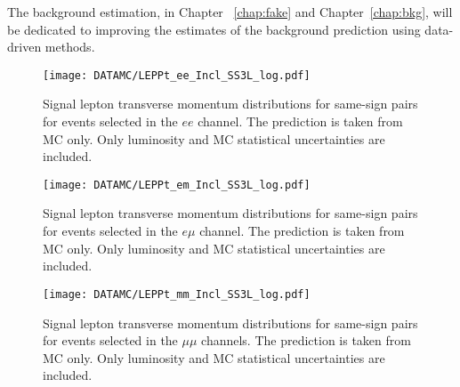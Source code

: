 The background estimation, in Chapter ~\ref{chap:fake} and Chapter~\ref{chap:bkg}, will be dedicated to improving the estimates of 
the background prediction using data-driven methods.



 \begin{figure}[htb!]
 \centering
 {\texttt{[image: DATAMC/LEPPt\_ee\_Incl\_SS3L\_log.pdf]}}
\caption{Signal lepton transverse momentum distributions for same-sign pairs for events selected in the $ee$ channel.  
The prediction is taken from MC only.
Only luminosity and MC statistical uncertainties are included.
}
\label{fig:dataMC_lep1.ee}
\end{figure}

 \begin{figure}[htb!]
 \centering
{\texttt{[image: DATAMC/LEPPt\_em\_Incl\_SS3L\_log.pdf]}}
\caption{Signal lepton transverse momentum distributions for same-sign pairs for events selected in the $e\mu$ channel.
The prediction is taken from MC only.
Only luminosity and MC statistical uncertainties are included.
}
\label{fig:dataMC_lep1.em}
\end{figure}

 \begin{figure}[htb!]
 \centering
{\texttt{[image: DATAMC/LEPPt\_mm\_Incl\_SS3L\_log.pdf]}}
\caption{Signal lepton transverse momentum distributions for same-sign pairs for events selected in the $\mu\mu$ channels.  
The prediction is taken from MC only.
Only luminosity and MC statistical uncertainties are included.
}
\label{fig:dataMC_lep1.mm}
\end{figure}

